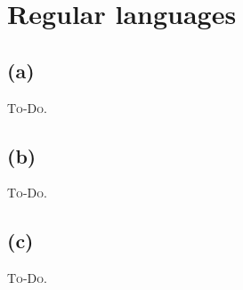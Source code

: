 


\setcounter{section}{1}

\section{Regular languages}

\subsection{(a)}

\textsc{To-Do.}

\subsection{(b)}

\textsc{To-Do.}

\subsection{(c)}

\textsc{To-Do.}


